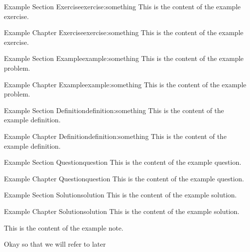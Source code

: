 \documentclass[11pt]{report}
\begin{document}
\begin{section_exercise}{Example Section Exercise}{exercise:something}
    This is the content of the example exercise.
\end{section_exercise}

\begin{chapter_exercise}{Example Chapter Exercise}{exercise:something}
    This is the content of the example exercise.
\end{chapter_exercise}

\begin{section_example}{Example Section Example}{example:something}
    This is the content of the example problem.
\end{section_example}

\begin{chapter_example}{Example Chapter Example}{example:something}
    This is the content of the example problem.
\end{chapter_example}

\begin{section_definition}{Example Section Definition}{definition:something}
    This is the content of the example definition.
\end{section_definition}

\begin{chapter_definition}{Example Chapter Definition}{definition:something}
    This is the content of the example definition.
\end{chapter_definition}

\begin{section_question}{Example Section Question}{question}
    This is the content of the example question.
\end{section_question}

\begin{chapter_question}{Example Chapter Question}{question}
    This is the content of the example question.
\end{chapter_question}

\begin{section_solution}{Example Section Solution}{solution}
    This is the content of the example solution.
\end{section_solution}

\begin{chapter_solution}{Example Chapter Solution}{solution}
    This is the content of the example solution.
\end{chapter_solution}

\begin{note}
    This is the content of the example note.
\end{note}



Okay so  that we will refer to later 
\end{document}
